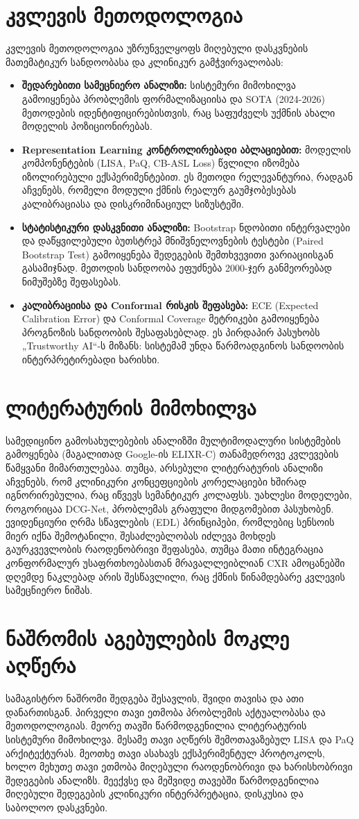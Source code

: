\documentclass[12pt,a4paper,oneside]{report}
\begin{document}
\section{კვლევის მეთოდოლოგია}
კვლევის მეთოდოლოგია უზრუნველყოფს მიღებული დასკვნების მათემატიკურ სანდოობასა და კლინიკურ გამჭვირვალობას:
\begin{itemize}
    \item \textbf{შედარებითი სამეცნიერო ანალიზი:} სისტემური მიმოხილვა გამოიყენება პრობლემის ფორმალიზაციისა და SOTA (2024-2026) მეთოდების იდენტიფიცირებისთვის, რაც საფუძველს უქმნის ახალი მოდელის პოზიციონირებას.
    \item \textbf{Representation Learning კონტროლირებადი აბლაციებით:} მოდელის კომპონენტების (LISA, PaQ, CB-ASL Loss) წვლილი იზომება იზოლირებული ექსპერიმენტებით. ეს მეთოდი რელევანტურია, რადგან აჩვენებს, რომელი მოდული ქმნის რეალურ გაუმჯობესებას კალიბრაციასა და დისკრიმინაციულ სიზუსტეში.
    \item \textbf{სტატისტიკური დასკვნითი ანალიზი:} Bootstrap ნდობითი ინტერვალები და დაწყვილებული ბუთსტრეპ მნიშვნელოვნების ტესტები (Paired Bootstrap Test) გამოიყენება შედეგების შემთხვევითი ვარიაციისგან გასამიჯნად. მეთოდის სანდოობა ეფუძნება 2000-ჯერ განმეორებად ნიმუშებზე შეფასებას.
    \item \textbf{კალიბრაციისა და Conformal რისკის შეფასება:} ECE (Expected Calibration Error) და Conformal Coverage მეტრიკები გამოიყენება პროგნოზის სანდოობის შესაფასებლად. ეს პირდაპირ პასუხობს „Trustworthy AI“-ს მიზანს: სისტემამ უნდა წარმოადგინოს სანდოობის ინტერპრეტირებადი ხარისხი.
\end{itemize}

\section{ლიტერატურის მიმოხილვა}
სამედიცინო გამოსახულებების ანალიზში მულტიმოდალური სისტემების გამოყენება (მაგალითად Google-ის ELIXR-C) თანამედროვე კვლევების წამყვანი მიმართულებაა. თუმცა, არსებული ლიტერატურის ანალიზი აჩვენებს, რომ კლინიკური კონცეფციების კორელაციები ხშირად იგნორირებულია, რაც იწვევს სემანტიკურ კოლაფსს. უახლესი მოდელები, როგორიცაა DCG-Net, პრობლემას გრაფული მიდგომებით პასუხობენ. ევიდენციური ღრმა სწავლების (EDL) პრინციპები, რომლებიც სენსოის მიერ იქნა შემოტანილი, შესაძლებლობას იძლევა მოხდეს გაურკვევლობის რაოდენობრივი შეფასება, თუმცა მათი ინტეგრაცია კონფორმალურ უსაფრთხოებასთან მრავალლეიბლიან CXR ამოცანებში დღემდე ნაკლებად არის შესწავლილი, რაც ქმნის წინამდებარე კვლევის სამეცნიერო ნიშას.

\section{ნაშრომის აგებულების მოკლე აღწერა}
სამაგისტრო ნაშრომი შედგება შესავლის, შვიდი თავისა და ათი დანართისგან. პირველი თავი ეთმობა პრობლემის აქტუალობასა და მეთოდოლოგიას. მეორე თავში წარმოდგენილია ლიტერატურის სისტემური მიმოხილვა. მესამე თავი აღწერს შემოთავაზებულ LISA და PaQ არქიტექტურას. მეოთხე თავი ასახავს ექსპერიმენტულ პროტოკოლს, ხოლო მეხუთე თავი ეთმობა მიღებული რაოდენობრივი და ხარისხობრივი შედეგების ანალიზს. მეექვსე და მეშვიდე თავებში წარმოდგენილია მიღებული შედეგების კლინიკური ინტერპრეტაცია, დისკუსია და საბოლოო დასკვნები.
\end{document}

